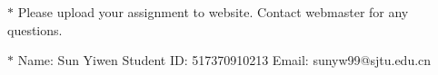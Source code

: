 \documentclass[12pt,a4paper]{article}
\theoremstyle{definition}
\begin{document}
\noindent

\noindent{}
\begin{center}
\footnotesize{\color{red}$*$ Please upload your assignment to website. Contact webmaster for any questions.}

\footnotesize{\color{blue}$*$ Name: Sun Yiwen  \quad Student ID: 517370910213 \quad Email: sunyw99@sjtu.edu.cn}
\end{center}


\begin{enumerate}


\end{enumerate}
\end{document}
